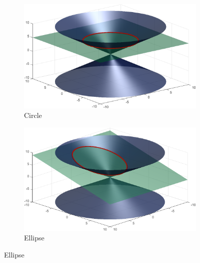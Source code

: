\documentclass[fleqn]{LectureClass/LectureClass}
\begin{document}
\begin{figure}
        \begin{subfigure}{0.45\textwidth}
            \centering
            \includegraphics[width=\textwidth]{images/conic-sections-circle}
            \caption{Circle}
        \end{subfigure}
        \begin{subfigure}{0.45\textwidth}
            \centering
            \includegraphics[width=\textwidth]{images/conic-sections-ellipse}
            \caption{Ellipse}
        \end{subfigure}
        

\end{figure}
\end{document}
